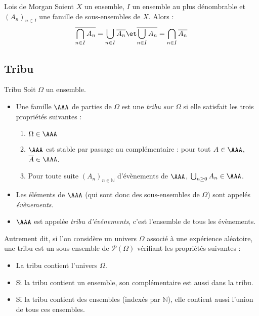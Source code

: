 \documentclass[french,11pt,twoside]{VcCours}
\begin{document}
\begin{Theoreme}{Lois de Morgan}
 Soient $X$ un ensemble, $I$ un ensemble au plus dénombrable et $(A_n)_{n\in I}$ une famille de sous-ensembles de $X$. Alors :
 $$ \overline{\bigcap_{n\in I} A_n} = \bigcup_{n\in I} \overline{A_n} \et \overline{\bigcup_{n\in I} A_n} = \bigcap_{n\in I} \overline{A_n}$$
\end{Theoreme}


\subsection{Tribu}

\begin{Definition}{Tribu}
Soit $\Omega $ un ensemble. 
\begin{itemize}
\item Une famille $\AAA$ de parties de $\Omega$ est une \emph{tribu sur $\Omega$} si elle satisfait les trois propriétés suivantes :
\begin{enumerate}
\item $\Omega \in\AAA$ 
\item $\AAA$ est stable par passage au complémentaire : pour tout $A \in\AAA$,  $\overline{A} \in \AAA$.
\item Pour toute suite $(A_n)_{n \in \mathbb{N}}$ d'évènements de $\AAA$, $\bigcup_{n \geq 0} A_n \in \AAA$.
\end{enumerate}
\item Les éléments de $\AAA$ (qui sont donc des sous-ensembles de $\Omega$) sont appelés \emph{évènements}.
\item $\AAA$ est appelée \emph{tribu d'événements}, c'est l'ensemble de tous les évènements.
\end{itemize}
\end{Definition}



Autrement dit, si l'on considère un univers $\Omega$ associé à une expérience aléatoire, une tribu est un sous-ensemble de $\mathcal{P}(\Omega)$ vérifiant les propriétés suivantes :
\begin{itemize}
\item La tribu contient l'univers $\Omega$.
\item Si la tribu contient un ensemble, son complémentaire est aussi dans la tribu.
\item Si la tribu contient des ensembles (indexés par $\mathbb{N}$), elle contient aussi l'union de tous ces ensembles.
\end{itemize}
\end{document}
